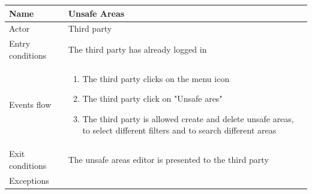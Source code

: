 \documentclass{article}
\begin{document}
\begin{table}[H]
    \begin{tabular}{|l|l|}
    \hline
    Name & \begin{minipage}[t]{0.7\textwidth}\textbf{Unsafe Areas} \end{minipage} \\ \hline  
    Actor & \begin{minipage}[t]{0.7\textwidth} Third party \end{minipage} \\ \hline 
    Entry conditions & \begin{minipage}[t]{0.7\textwidth} The third party has already logged in\end{minipage} \\
    \hline 
    Events flow & \begin{minipage}[t]{0.7\textwidth}
    \begin{enumerate}
        \item The third party clicks on the menu icon
        \item The third party click on "Unsafe ares"
        \item The third party is allowed create and delete unsafe areas, to
        select different filters and to search different areas
    \end{enumerate} 
    \end{minipage} \\ \hline
    Exit conditions & \begin{minipage}[t]{0.7\textwidth} The unsafe areas editor
    is presented to the third party\end{minipage} \\
    \hline
    Exceptions & \begin{minipage}[t]{0.7\textwidth} \end{minipage} \\ \hline
    \end{tabular}
\end{table}
\end{document}
